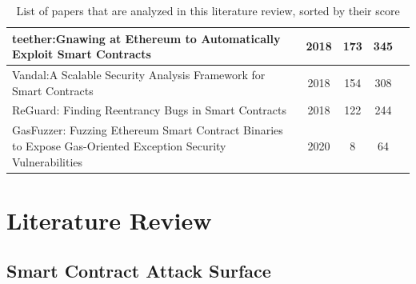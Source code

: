 \documentclass[a4paper,11pt]{article}
\begin{document}
\begin{table}[t]
\begin{center}
\begin{tabular}{||p{11cm}|c|c|c|c||}
                teether:Gnawing at Ethereum to Automatically Exploit Smart Contracts & 2018  & 173 & 345 & \cite{krupp2018teether} \\
                \hline
                Vandal:A Scalable Security Analysis Framework for Smart Contracts & 2018  & 154 & 308 & \cite{brent2018vandal} \\
                \hline
                ReGuard: Finding Reentrancy Bugs in Smart Contracts & 2018  & 122 & 244 & \cite{liu2018reguard} \\
                \hline
                GasFuzzer: Fuzzing Ethereum Smart Contract Binaries to Expose Gas-Oriented Exception Security Vulnerabilities & 2020  & 8 & 64 & \cite{ashraf2020gasfuzzer} \\
                \hline
            \end{tabular}
            \label{table:studies}
            \caption{List of papers that are analyzed in this literature review, sorted by their score}
        \end{center}
\end{table}

\section{Literature Review}

\subsection{Smart Contract Attack Surface}
\end{document}
